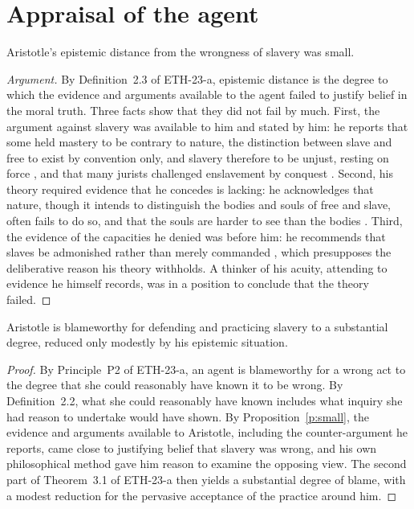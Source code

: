 \documentclass{situationist-preprint}
\begin{document}
\section{Appraisal of the agent}

\begin{proposition}\label{p:small}
Aristotle's epistemic distance from the wrongness of slavery was small.
\end{proposition}

\begin{proof}[Argument]
By Definition~2.3 of ETH-23-a, epistemic distance is the degree to which the evidence and arguments available to the agent failed to justify belief in the moral truth. Three facts show that they did not fail by much. First, the argument against slavery was available to him and stated by him: he reports that some held mastery to be contrary to nature, the distinction between slave and free to exist by convention only, and slavery therefore to be unjust, resting on force \citep[I.3]{AristotlePol}, and that many jurists challenged enslavement by conquest \citep[I.6]{AristotlePol}. Second, his theory required evidence that he concedes is lacking: he acknowledges that nature, though it intends to distinguish the bodies and souls of free and slave, often fails to do so, and that the souls are harder to see than the bodies \citep[I.5]{AristotlePol}. Third, the evidence of the capacities he denied was before him: he recommends that slaves be admonished rather than merely commanded \citep[I.13]{AristotlePol}, which presupposes the deliberative reason his theory withholds. A thinker of his acuity, attending to evidence he himself records, was in a position to conclude that the theory failed.
\end{proof}

\begin{proposition}\label{p:blame}
Aristotle is blameworthy for defending and practicing slavery to a substantial degree, reduced only modestly by his epistemic situation.
\end{proposition}

\begin{proof}
By Principle~P2 of ETH-23-a, an agent is blameworthy for a wrong act to the degree that she could reasonably have known it to be wrong. By Definition~2.2, what she could reasonably have known includes what inquiry she had reason to undertake would have shown. By Proposition~\ref{p:small}, the evidence and arguments available to Aristotle, including the counter-argument he reports, came close to justifying belief that slavery was wrong, and his own philosophical method gave him reason to examine the opposing view. The second part of Theorem~3.1 of ETH-23-a then yields a substantial degree of blame, with a modest reduction for the pervasive acceptance of the practice around him.
\end{proof}
\end{document}
